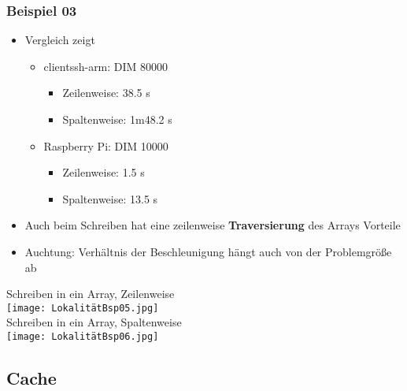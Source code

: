 		\subsubsection{Beispiel 03}
		\begin{minipage}{0.5\textwidth}
			\begin{itemize}
				\item Vergleich zeigt
					\begin{itemize}
						\item clientssh-arm: DIM 80000
							\begin{itemize}
								\item Zeilenweise: 38.5 s
								\item Spaltenweise: 1m48.2 s
							\end{itemize}
						\item Raspberry Pi: DIM 10000
							\begin{itemize}
								\item Zeilenweise: 1.5 s
								\item Spaltenweise: 13.5 s
							\end{itemize}
					\end{itemize}
				\item Auch beim Schreiben hat eine zeilenweise \textbf{Traversierung} des Arrays Vorteile
				\item Auchtung: Verhältnis der Beschleunigung hängt auch von der Problemgrö\ss e ab
			\end{itemize}
		\end{minipage}
		\begin{minipage}{0.45\textwidth}
			\begin{center}	
				Schreiben in ein Array, Zeilenweise \\
				\texttt{[image: LokalitätBsp05.jpg]} \\
				Schreiben in ein Array, Spaltenweise \\
				\texttt{[image: LokalitätBsp06.jpg]}
			\end{center}
		\end{minipage}

	
	\subsection{Cache}
